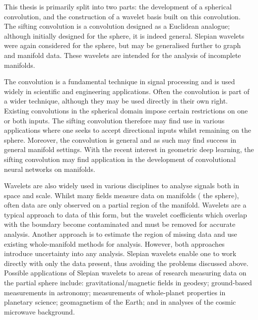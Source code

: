 \begin{impactstatement} %
	This thesis is primarily split into two parts: the development of a spherical convolution, and the construction of a wavelet basis built on this convolution.
	The sifting convolution is a convolution designed as a Euclidean analogue; although initially designed for the sphere, it is indeed general.
	Slepian wavelets were again considered for the sphere, but may be generalised further to graph and manifold data.
	These wavelets are intended for the analysis of incomplete manifolds.

	The convolution is a fundamental technique in signal processing and is used widely in scientific and engineering applications.
	Often the convolution is part of a wider technique, although they may be used directly in their own right.
	Existing convolutions in the spherical domain impose certain restrictions on one or both inputs.
	The sifting convolution therefore may find use in various applications where one seeks to accept directional inputs whilst remaining on the sphere.
	Moreover, the convolution is general and as such may find success in general manifold settings.
	With the recent interest in geometric deep learning, the sifting convolution may find application in the development of convolutional neural networks on manifolds.

	Wavelets are also widely used in various disciplines to analyse signals both in space and scale.
	Whilst many fields measure data on manifolds (\ie{} the sphere), often data are only observed on a partial region of the manifold.
	Wavelets are a typical approach to data of this form, but the wavelet coefficients which overlap with the boundary become contaminated and must be removed for accurate analysis.
	Another approach is to estimate the region of missing data and use existing whole-manifold methods for analysis.
	However, both approaches introduce uncertainty into any analysis.
	Slepian wavelets enable one to work directly with only the data present, thus avoiding the problems discussed above.
	Possible applications of Slepian wavelets to areas of research measuring data on the partial sphere include: gravitational/magnetic fields in geodesy; ground-based measurements in astronomy; measurements of whole-planet properties in planetary science; geomagnetism of the Earth; and in analyses of the cosmic microwave background.
\end{impactstatement}

